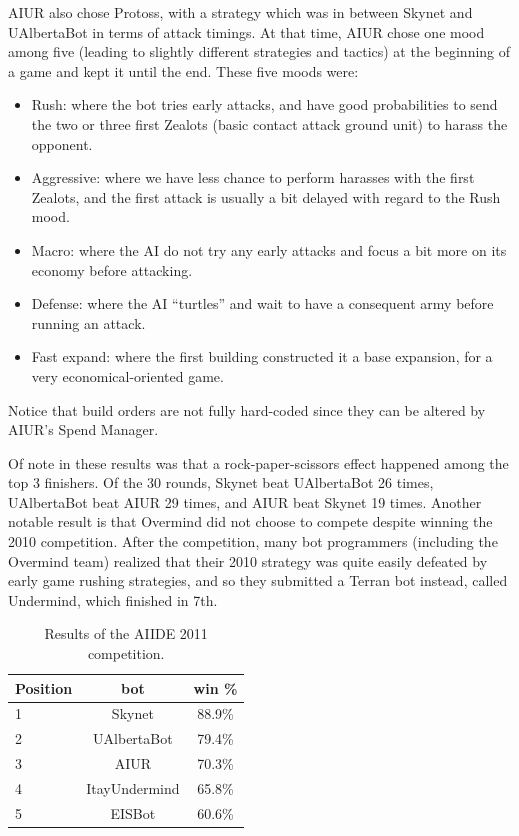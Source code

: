 \documentclass[journal]{IEEEtran}
\begin{document}
AIUR also chose  Protoss, with a strategy which  was in between Skynet
and UAlbertaBot in terms of  attack timings.  At that time, AIUR chose
one  mood among  five (leading  to slightly  different  strategies and
tactics) at the  beginning of a game and kept it  until the end. These
five moods were:
\begin{itemize}
\item  Rush:  where  the  bot  tries  early  attacks,  and  have  good
  probabilities to send the two or three first Zealots (basic contact attack ground unit) to harass the
  opponent.
\item Aggressive: where  we have less chance to  perform harasses with
  the first Zealots, and the first attack is usually a bit delayed
  with regard to the Rush mood.
\item Macro: where the AI do not try any early attacks and focus a bit
  more on its economy before attacking.
\item Defense: where the AI  ``turtles'' and wait to have a consequent
  army before running an attack.
\item  Fast expand:  where the  first building  constructed it  a base
  expansion, for a very economical-oriented game.
\end{itemize}
Notice that  build orders are not  fully hard-coded since  they can be
altered by AIUR's Spend Manager.

Of  note  in  these  results  was that  a  rock-paper-scissors  effect
happened among  the top  3 finishers.  Of  the 30 rounds,  Skynet beat
UAlbertaBot 26  times, UAlbertaBot beat  AIUR 29 times, and  AIUR beat
Skynet  19 times.   Another notable  result is  that Overmind  did not
choose  to compete despite  winning the  2010 competition.   After the
competition,  many  bot  programmers  (including  the  Overmind  team)
realized that their  2010 strategy was quite easily  defeated by early
game rushing strategies,  and so they submitted a  Terran bot instead,
called Undermind, which finished in 7th.

\begin{table}[t!]
\caption{Results of the AIIDE 2011 competition.}
\label{tab:aiide2011}
\begin{small}
\begin{center}
\begin{tabular}{|l|c|c|}
\hline
Position & bot & win \% \\ \hline
1 & Skynet & 88.9\% \\
2 & UAlbertaBot & 79.4\% \\
3 & AIUR & 70.3\% \\
4 & ItayUndermind & 65.8\% \\
5 & EISBot & 60.6\% \\ \hline
\end{tabular}
\end{center}
\end{small}
\end{table}
\end{document}
